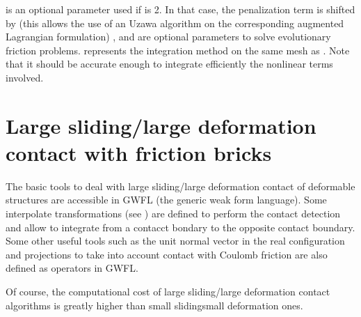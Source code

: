 \documentclass[a4paper,11pt,english]{sphinxmanual}
\begin{document}
 is an optional parameter used if  is 2.
In that case, the penalization term is shifted by 
(this allows the use of an Uzawa algorithm on the corresponding augmented
Lagrangian formulation)
,  and  are optional
parameters to solve evolutionary friction problems.
 represents the integration method on the same mesh as .
Note that it should be accurate enough to integrate efficiently the nonlinear
terms involved.

\ignorespaces 

\section{Large sliding/large deformation contact with friction bricks}
\label{\detokenize{userdoc/model_contact_friction_large_sliding:large-sliding-large-deformation-contact-with-friction-bricks}}\label{\detokenize{userdoc/model_contact_friction_large_sliding:ud-model-contact-friction-large}}\label{\detokenize{userdoc/model_contact_friction_large_sliding:index-0}}\label{\detokenize{userdoc/model_contact_friction_large_sliding::doc}}
The basic tools to deal with large sliding/large deformation contact of deformable structures are accessible in GWFL (the generic weak form language). Some interpolate transformations (see {\hyperref[\detokenize{userdoc/gasm_high:ud-gasm-high-transf}]{}}) are defined to perform the contact detection and allow to integrate from a contacct bondary to the opposite contact boundary. Some other useful tools such as the unit normal vector in the real configuration and projections to take into account contact with Coulomb friction are also defined as operators in GWFL.

Of course, the computational cost of large sliding/large deformation contact algorithms is greatly higher than small sliding\sphinxhyphen{}small deformation ones.
\end{document}
